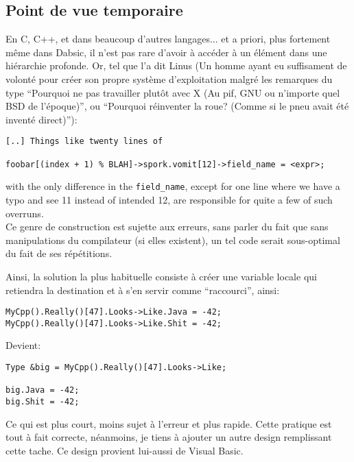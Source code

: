 \documentclass[a5paper, 12pt]{book}
\begin{document}
\subsection{Point de vue temporaire}

En C, C++, et dans beaucoup d'autres langages... et a priori,
plus fortement même dans Dabsic, il n'est pas rare d'avoir à
accéder à un élément dans une hiérarchie profonde. Or, tel que
l'a dit Linus (Un homme ayant eu suffisament de volonté pour
créer son propre système d'exploitation malgré les remarques
du type ``Pourquoi ne pas travailler plutôt avec X (Au pif,
GNU ou n'importe quel BSD de l'époque)'', ou ``Pourquoi
réinventer la roue? (Comme si le pneu avait été inventé direct)''):\\

\begin{verbatim}
[..] Things like twenty lines of

foobar[(index + 1) % BLAH]->spork.vomit[12]->field_name = <expr>;
\end{verbatim}

with the only difference in the \verb!field_name!, except for one line where
we have a typo and see 11 instead of intended 12, are responsible for quite
a few of such overruns.\\

Ce genre de construction est sujette aux erreurs, sans parler
du fait que sans manipulations du compilateur (si elles existent),
un tel code serait sous-optimal du fait de ses répétitions.

Ainsi, la solution la plus habituelle consiste à créer une
variable locale qui retiendra la destination et à s'en servir
comme ``raccourci'', ainsi:\\

\begin{verbatim}
MyCpp().Really()[47].Looks->Like.Java = -42;
MyCpp().Really()[47].Looks->Like.Shit = -42;
\end{verbatim}

Devient:\\

\begin{verbatim}
Type &big = MyCpp().Really()[47].Looks->Like;

big.Java = -42;
big.Shit = -42;
\end{verbatim}

Ce qui est plus court, moins sujet à l'erreur et plus rapide.
Cette pratique est tout à fait correcte, néanmoins, je tiens
à ajouter un autre design remplissant cette tache. Ce design
provient lui-aussi de Visual Basic.
\end{document}
